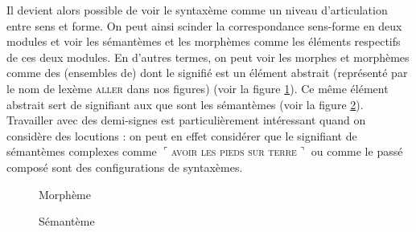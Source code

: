 Il devient alors possible de voir le syntaxème comme un niveau d’articulation entre sens et forme. On peut ainsi scinder la correspondance sens-forme en deux modules et voir les sémantèmes et les morphèmes comme les éléments respectifs de ces deux modules. En d’autres termes, on peut voir les morphes et morphèmes comme des (ensembles de)  dont le signifié est un élément abstrait (représenté par le nom de lexème \textsc{aller} dans nos figures) (voir la figure \ref{fig:2.3-morpheme}). Ce même élément abstrait sert de signifiant aux  que sont les sémantèmes (voir la figure \ref{fig:2.3-semanteme}). Travailler avec des demi-signes est particulièrement intéressant quand on considère des locutions : on peut en effet considérer que le signifiant de sémantèmes complexes comme $⌜$\textsc{avoir} \textsc{les} \textsc{pieds} \textsc{sur} \textsc{terre}$⌝$ ou comme le passé composé sont des configurations de syntaxèmes.

\begin{figure}
\caption{Morphème\label{fig:2.3-morpheme}}
\end{figure}

\begin{figure}
\caption{Sémantème\label{fig:2.3-semanteme}}    
\end{figure}



